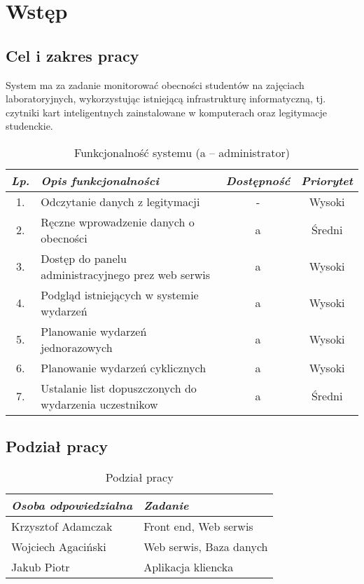 \newpage\section{Wstęp}\label{sec:wstep}
\subsection{Cel i zakres pracy}

System ma za zadanie monitorować obecności studentów na zajęciach laboratoryjnych, wykorzystując istniejącą infrastrukturę informatyczną, tj. czytniki kart inteligentnych zainstalowane w komputerach oraz legitymacje studenckie.
\begin{table}[!ht]
\centering
    \begin{tabular}{|c|p{6cm}|c|c|}
        \hline
        \textit{Lp.} & \textit{Opis funkcjonalności} & \textit{Dostępność}  & \textit{Priorytet} \\ \hline
        1. & Odczytanie danych z legitymacji & - & Wysoki \\ \hline
        2. & Ręczne wprowadzenie danych o obecności& a & Średni \\ \hline
        3. & Dostęp do panelu administracyjnego prez web serwis & a & Wysoki \\ \hline
        4. & Podgląd istniejących w systemie wydarzeń & a & Wysoki \\ \hline
        5. & Planowanie wydarzeń jednorazowych & a & Wysoki \\ \hline
        6. & Planowanie wydarzeń cyklicznych & a & Wysoki \\ \hline
        7. & Ustalanie list dopuszczonych do wydarzenia uczestnikow & a & Średni \\ \hline
    \end{tabular}
    \caption{Funkcjonalność systemu \NazwaSys (a -- administrator)}
    \label{table:tab1}
\end{table}

\subsection{Podział pracy}

\begin{table}
\centering
\caption{Podział pracy}
    \begin{tabular}{|p{4cm}|p{5cm}|}
        \hline
        \textit{Osoba odpowiedzialna} & \textit{Zadanie} \\ \hline
        Krzysztof Adamczak & Front end, Web serwis \\ \hline
        Wojciech Agaciński & Web serwis, Baza danych  \\ \hline
        Jakub Piotr & Aplikacja kliencka  \\  \hline
    \end{tabular} 
    \label{table:tab2}
\end{table}
